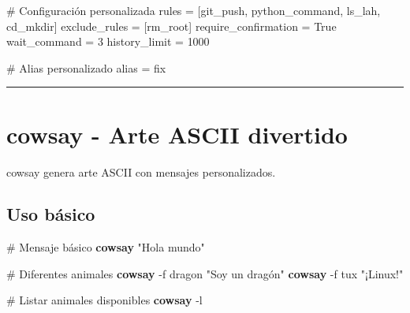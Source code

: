 \documentclass[
  11pt,
  letterpaper,
  oneside,
  openany]{scrbook}
\newenvironment{Shaded}{}{}
\newcommand{\AttributeTok}[1]{\textcolor[rgb]{0.84,0.23,0.29}{#1}}
\newcommand{\CommentTok}[1]{\textcolor[rgb]{0.42,0.45,0.49}{#1}}
\newcommand{\DecValTok}[1]{\textcolor[rgb]{0.00,0.36,0.77}{#1}}
\newcommand{\ExtensionTok}[1]{\textcolor[rgb]{0.84,0.23,0.29}{\textbf{#1}}}
\newcommand{\NormalTok}[1]{\textcolor[rgb]{0.14,0.16,0.18}{#1}}
\newcommand{\OperatorTok}[1]{\textcolor[rgb]{0.14,0.16,0.18}{#1}}
\newcommand{\StringTok}[1]{\textcolor[rgb]{0.01,0.18,0.38}{#1}}
\newcommand{\VariableTok}[1]{\textcolor[rgb]{0.89,0.38,0.04}{#1}}
\begin{document}
\begin{Shaded}
\begin{Highlighting}[]
\CommentTok{\# Configuración personalizada}
\NormalTok{rules }\OperatorTok{=}\NormalTok{ [}\StringTok{\textquotesingle{}git\_push\textquotesingle{}}\NormalTok{, }\StringTok{\textquotesingle{}python\_command\textquotesingle{}}\NormalTok{, }\StringTok{\textquotesingle{}ls\_lah\textquotesingle{}}\NormalTok{, }\StringTok{\textquotesingle{}cd\_mkdir\textquotesingle{}}\NormalTok{]}
\NormalTok{exclude\_rules }\OperatorTok{=}\NormalTok{ [}\StringTok{\textquotesingle{}rm\_root\textquotesingle{}}\NormalTok{]}
\NormalTok{require\_confirmation }\OperatorTok{=} \VariableTok{True}
\NormalTok{wait\_command }\OperatorTok{=} \DecValTok{3}
\NormalTok{history\_limit }\OperatorTok{=} \DecValTok{1000}

\CommentTok{\# Alias personalizado}
\NormalTok{alias }\OperatorTok{=} \StringTok{\textquotesingle{}fix\textquotesingle{}}
\end{Highlighting}
\end{Shaded}

\begin{center}\rule{0.5\linewidth}{0.5pt}\end{center}

\section{cowsay - Arte ASCII divertido}\label{sec-cowsay}

cowsay genera arte ASCII con mensajes personalizados.

\subsection{Uso básico}\label{uso-buxe1sico-8}

\begin{Shaded}
\begin{Highlighting}[]
\CommentTok{\# Mensaje básico}
\ExtensionTok{cowsay} \StringTok{"Hola mundo"}

\CommentTok{\# Diferentes animales}
\ExtensionTok{cowsay} \AttributeTok{{-}f}\NormalTok{ dragon }\StringTok{"Soy un dragón"}
\ExtensionTok{cowsay} \AttributeTok{{-}f}\NormalTok{ tux }\StringTok{"¡Linux!"}

\CommentTok{\# Listar animales disponibles}
\ExtensionTok{cowsay} \AttributeTok{{-}l}
\end{Highlighting}
\end{Shaded}
\end{document}
